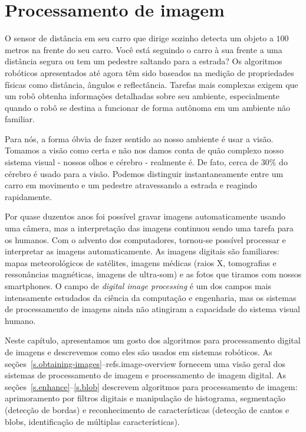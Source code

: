 
\chapter{Processamento de imagem}\label{ch.image}

O sensor de distância em seu carro que dirige sozinho detecta um objeto a $100$ metros na frente do seu carro. Você está seguindo o carro à sua frente a uma distância segura ou tem um pedestre saltando para a estrada? Os algoritmos robóticos apresentados até agora têm sido baseados na medição de propriedades físicas como distância, ângulos e reflectância. Tarefas mais complexas exigem que um robô obtenha informações detalhadas sobre seu ambiente, especialmente quando o robô se destina a funcionar de forma autônoma em um ambiente não familiar.

Para nós, a forma óbvia de fazer sentido ao nosso ambiente é usar a visão. Tomamos a visão como certa e não nos damos conta de quão complexo nosso sistema visual - nossos olhos e cérebro - realmente é. De fato, cerca de $30\%$ do cérebro é usado para a visão. Podemos distinguir instantaneamente entre um carro em movimento e um pedestre atravessando a estrada e reagindo rapidamente.

Por quase duzentos anos foi possível gravar imagens automaticamente usando uma câmera, mas a interpretação das imagens continuou sendo uma tarefa para os humanos. Com o advento dos computadores, tornou-se possível processar e interpretar as imagens automaticamente. As imagens digitais são familiares: mapas meteorológicos de satélites, imagens médicas (raios X, tomografias e ressonâncias magnéticas, imagens de ultra-som) e as fotos que tiramos com nossos smartphones. O campo de \emph{digital image processing} é um dos campos mais intensamente estudados da ciência da computação e engenharia, mas os sistemas de processamento de imagens ainda não atingiram a capacidade do sistema visual humano.

Neste capítulo, apresentamos um gosto dos algoritmos para processamento digital de imagens e descrevemos como eles são usados em sistemas robóticos. As seções~\ref{s.obtaining-images}--ref{s.image-overview} fornecem uma visão geral dos sistemas de processamento de imagem e processamento de imagem digital. As seções~\ref{s.enhance}--\ref{s.blob} descrevem algoritmos para processamento de imagem: aprimoramento por filtros digitais e manipulação de histograma, segmentação (detecção de bordas) e reconhecimento de características (detecção de cantos e blobs, identificação de múltiplas características).

